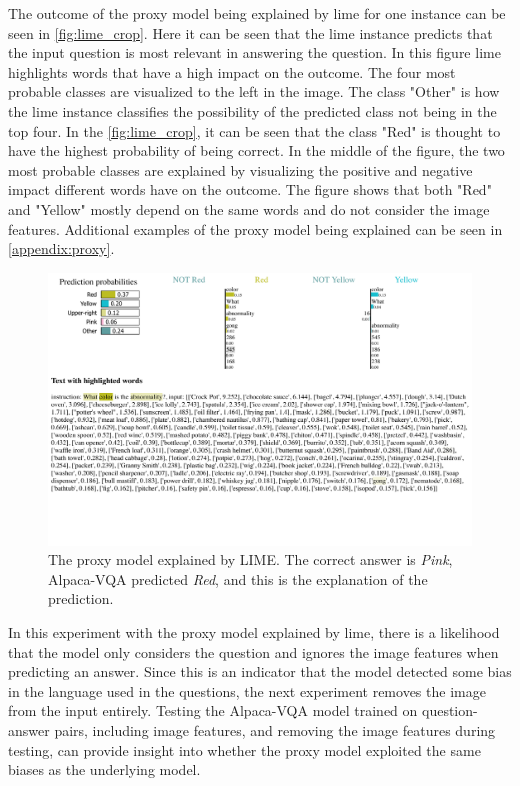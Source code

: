     The outcome of the proxy model being explained by \gls{lime} for one instance can be seen in \autoref{fig:lime_crop}. Here it can be seen that the \gls{lime} instance predicts that the input question is most relevant in answering the question. 
    In this figure \gls{lime} highlights words that have a high impact on the outcome. The four most probable classes are visualized to the left in the image. The class "Other" is how the \gls{lime} instance classifies the possibility of the predicted class not being in the top four.
    In the \autoref{fig:lime_crop}, it can be seen that the class "Red" is thought to have the highest probability of being correct. In the middle of the figure, the two most probable classes are explained by visualizing the positive and negative impact different words have on the outcome. The figure shows that both "Red" and "Yellow" mostly depend on the same words and do not consider the image features. Additional examples of the proxy model being explained can be seen in \autoref{appendix:proxy}.

    
    \begin{figure}[htb]
        \centerline{
        \includegraphics[width=1.3\textwidth]{images/LIME_4.pdf}}
        \caption[The proxy model explained by LIME.]{The proxy model explained by LIME. The correct answer is \textit{Pink}, Alpaca-VQA predicted \textit{Red}, and this is the explanation of the prediction.}
        \label{fig:lime_crop}
    \end{figure} 

    In this experiment with the proxy model explained by \gls{lime}, there is a likelihood that the model only considers the question and ignores the image features when predicting an answer. Since this is an indicator that the model detected some bias in the language used in the questions, the next experiment removes the image from the input entirely. Testing the Alpaca-VQA model trained on question-answer pairs, including image features, and removing the image features during testing, can provide insight into whether the proxy model exploited the same biases as the underlying model.
    
